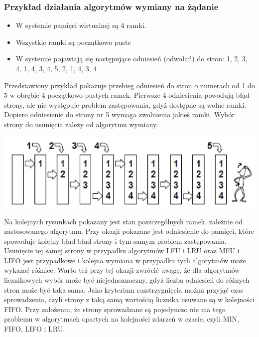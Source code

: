 \documentclass[12pt]{article}
\begin{document}
    \subsubsection{Przykład działania algorytmów wymiany na żądanie}
    \begin{itemize}
        \item W systemie pamięci wirtualnej są 4 ramki.
        \item Wszystkie ramki są początkowo puste
        \item W systemie pojawiają się następujące odniesień (odwołań) do stron: 1, 2, 3, 4, 1, 4, 3, 4, 5, 2, 1, 4, 3, 4
    \end{itemize}
    Przedstawiony przykład pokazuje przebieg odniesień
    do stron o numerach od 1 do 5 w obrębie 4
    początkowo pustych ramek. Pierwsze 4 odniesienia
    powodują błąd strony, ale nie występuje problem
    zastępowania, gdyż dostępne są wolne ramki.
    Dopiero odniesienie do strony nr 5 wymaga
    zwolnienia jakieś ramki. Wybór strony do usunięcia
    zależy od algorytmu wymiany.
    
    \begin{center}
            \includegraphics[scale=0.4]{graphics/paging/paging-1.jpg}
    \end{center}
    
    Na kolejnych rysunkach pokazany jest stan poszczególnych ramek,
    zależnie od zastosowanego algorytmu. Przy okazji pokazane jest
    odniesienie do pamięci, które spowoduje kolejny błąd błąd strony i
    tym samym problem zastępowania. Usunięcie tej samej strony w
    przypadku algorytmów LFU i LRU oraz MFU i LIFO jest przypadkowe
    i kolejna wymiana w przypadku tych algorytmów może wykazać
    różnice.
    Warto też przy tej okazji zwrócić uwagę, że dla algorytmów
    licznikowych wybór może być niejednoznaczny, gdyż liczba
    odniesień do różnych stron może być taka sama. Jako kryterium
    rozstrzygnięcia można przyjąć czas sprowadzenia, czyli strony z taką
    samą wartością licznika usuwane są w kolejności FIFO. Przy
    założeniu, że strony sprowadzane są pojedynczo nie ma tego
    problemu w algorytmach opartych na kolejności zdarzeń w czasie,
    czyli MIN, FIFO, LIFO i LRU.
    
\end{document}
